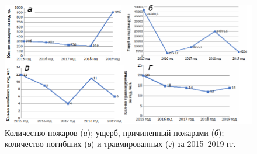 \begin{figure}[h!]
\begin{changemargin}{-1cm}{0cm}
  \begin{center}
    \includegraphics[width=1.2\textwidth]{authors/zelencov_fig1.png}
  \end{center}
  \end{changemargin}
  \caption{Количество пожаров (\textit{а}); ущерб, причиненный пожарами (\textit{б}); количество погибших (\textit{в}) и травмированных (\textit{г}) за 2015--2019 гг.}
  \label{fig:zelencov_fig1}
\end{figure}
